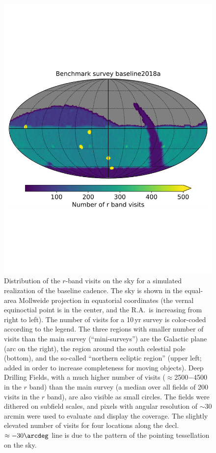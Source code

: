 \begin{figure}
\vskip -0.95in
\includegraphics[width=1.0\hsize,clip]{nvisits_baseline2018a}
\vskip -1.1in
\caption{Distribution of the $r$-band visits on the sky for a simulated
realization of the baseline cadence. The sky is shown in the equal-area Mollweide
projection in equatorial coordinates (the vernal equinoctial point is in the center, and
the R.A.\ is increasing from right to left). The number of visits for
a 10\,yr survey is color-coded according
to the legend. The three regions with smaller number of visits than the main survey
(``mini-surveys'') are the Galactic plane (arc on the right), the region around the
south celestial pole (bottom), and the so-called ``northern ecliptic region'' (upper left;
added in order to increase completeness for moving objects). Deep Drilling Fields, with
a much higher number of visits ($\approx$2500$-$4500 in the $r$ band) than the main survey
(a median over all fields of 200 visits in the $r$ band), are also visible as small circles.
The fields were dithered on subfield scales, and pixels with angular resolution of
$\sim$30 arcmin were used to evaluate and display the coverage.
The slightly elevated number of visits for four locations along the decl.\ $\approx -30\arcdeg$ line
is due to the pattern of the pointing tessellation on the sky.}
\label{Fig:rbandSky}
\end{figure}

